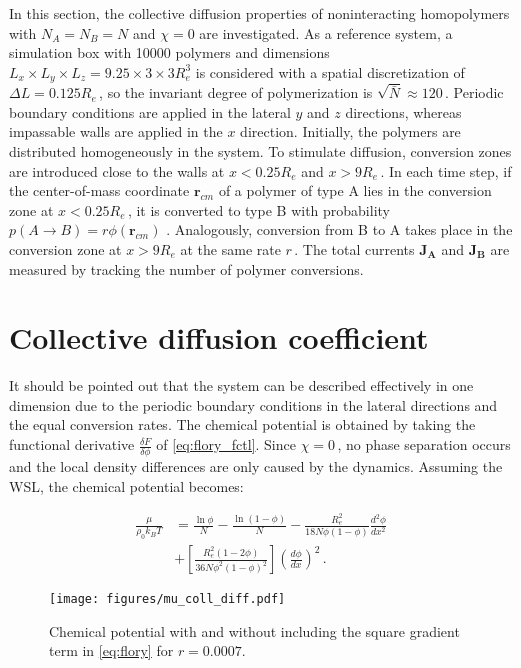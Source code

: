 \documentclass[bachelor,       %
               twoside,        %
               BCOR10mm,       %
                ngerman,english  %
               ]{GAUBM}
\begin{document}
In this section, the collective diffusion properties of noninteracting homopolymers with $N_A=N_B=N$ and $\chi=0$ are investigated. As a reference system, a simulation box with 10000 polymers and dimensions $L_x\times L_y\times L_z=9.25\times3\times3R_e^3$ is considered with a spatial discretization of $\Delta L=0.125R_e\,$, so the invariant degree of polymerization is $\sqrt{\bar{N}}\approx 120\,$. Periodic boundary conditions are applied in the lateral $y$ and $z$ directions, whereas impassable walls are applied in the $x$ direction. Initially, the polymers are distributed homogeneously in the system. To stimulate diffusion, conversion zones are introduced close to the walls at $x<0.25R_e$ and $x>9R_e\,$. In each time step, if the center-of-mass coordinate $\mathbf r_{cm}$ of a polymer of type A lies in the conversion zone at $x<0.25R_e\,$, it is converted to type B with probability $p(A\rightarrow B)=r\phi(\mathbf r_{cm})$ \cite{Dreyer22}. Analogously, conversion from B to A takes place in the conversion zone at $x>9R_e$ at the same rate $r\,$. The total currents $\mathbf{J_A}$ and $\mathbf{J_B}$ are measured by tracking the number of polymer conversions. 

\section{Collective diffusion coefficient}

It should be pointed out that the system can be described effectively in one dimension due to the periodic boundary conditions in the lateral directions and the equal conversion rates. The chemical potential is obtained by taking the functional derivative $\frac{\delta F}{\delta\phi}$ of \eqref{eq:flory_fctl}. Since $\chi=0\,$, no phase separation occurs and the local density differences are only caused by the dynamics. Assuming the WSL, the chemical potential becomes:


\begin{align}
  \frac{\mu}{\rho_0 k_BT}&=\frac{\ln\phi}{N}-\frac{\ln(1-\phi)}{N}-\frac{R_e^2}{18N\phi(1-\phi)}\frac{d^2\phi}{dx^2}\nonumber \\ &+\left[\frac{R_e^2(1-2\phi)}{36N\phi^2(1-\phi)^2}\right]\left(\frac{d\phi}{dx}\right)^2\,.
  \label{eq:flory}
\end{align}


\begin{figure}[h]
  \centering
  \texttt{[image: figures/mu\_coll\_diff.pdf]}
  \caption{Chemical potential with and without including the square gradient term in \eqref{eq:flory} for $r=0.0007$.}
  \label{fig:mu_coll_diff}
\end{figure}
\end{document}
